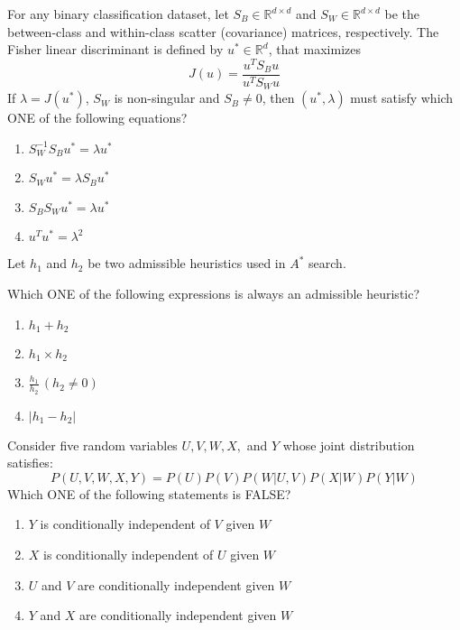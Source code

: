 \item For any binary classification dataset, let $S_B \in \mathbb{R}^{d \times d}$ and $S_W \in \mathbb{R}^{d \times d}$ be the between-class and within-class scatter (covariance) matrices, respectively. The Fisher linear discriminant is defined by $u^* \in \mathbb{R}^d$, that maximizes
\[
J(u) = \frac{u^T S_B u}{u^T S_W u}
\]
If $\lambda = J(u^*)$, $S_W$ is non-singular and $S_B \neq 0$, then $(u^*, \lambda)$ must satisfy which ONE of the following equations?

\begin{enumerate}
    \item $S_W^{-1} S_B u^* = \lambda u^*$
    \item $S_W u^* = \lambda S_B u^*$
    \item $S_B S_W u^* = \lambda u^*$
    \item $u^T u^* = \lambda^2$
\end{enumerate}

    \item Let $h_1$ and $h_2$ be two admissible heuristics used in $A^*$ search.
    
    Which ONE of the following expressions is always an admissible heuristic?
    
    \begin{enumerate}
        \item $h_1 + h_2$
        \item $h_1 \times h_2$
        \item $\frac{h_1}{h_2} \, (h_2 \neq 0)$
        \item $|h_1 - h_2|$
    \end{enumerate}

    \item Consider five random variables $U, V, W, X,$ and $Y$ whose joint distribution satisfies:
    \[
    P(U, V, W, X, Y) = P(U) P(V) P(W | U, V) P(X | W) P(Y | W)
    \]
    Which ONE of the following statements is FALSE?
    
    \begin{enumerate}
        \item $Y$ is conditionally independent of $V$ given $W$
        \item $X$ is conditionally independent of $U$ given $W$
        \item $U$ and $V$ are conditionally independent given $W$
        \item $Y$ and $X$ are conditionally independent given $W$
    \end{enumerate}

